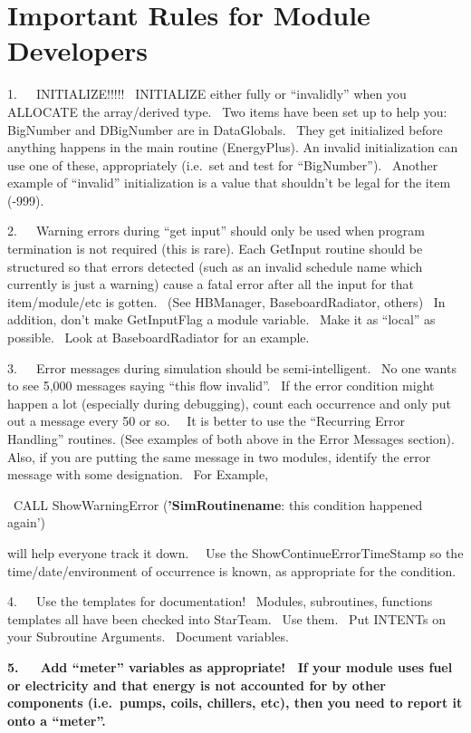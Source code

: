 \chapter{Important Rules for Module Developers}\label{important-rules-for-module-developers}

1.~~~INITIALIZE!!!!!~ INITIALIZE either fully or ``invalidly'' when you ALLOCATE the array/derived type.~ Two items have been set up to help you: BigNumber and DBigNumber are in DataGlobals.~ They get initialized before anything happens in the main routine (EnergyPlus). An invalid initialization can use one of these, appropriately (i.e.~set and test for ``BigNumber'').~ Another example of ``invalid'' initialization is a value that shouldn't be legal for the item (-999).

2.~~~Warning errors during ``get input'' should only be used when program termination is not required (this is rare). Each GetInput routine should be structured so that errors detected (such as an invalid schedule name which currently is just a warning) cause a fatal error after all the input for that item/module/etc is gotten.~ (See HBManager, BaseboardRadiator, others)~ In addition, don't make GetInputFlag a module variable.~ Make it as ``local'' as possible.~ Look at BaseboardRadiator for an example.

3.~~~Error messages during simulation should be semi-intelligent.~ No one wants to see 5,000 messages saying ``this flow invalid''.~ If the error condition might happen a lot (especially during debugging), count each occurrence and only put out a message every 50 or so.~~ It is better to use the ``Recurring Error Handling'' routines. (See examples of both above in the Error Messages section).~ Also, if you are putting the same message in two modules, identify the error message with some designation.~ For Example,

~CALL ShowWarningError (\textbf{'SimRoutinename}: this condition happened again')

will help everyone track it down.~~ Use the ShowContinueErrorTimeStamp so the time/date/environment of occurrence is known, as appropriate for the condition.

4.~~~Use the templates for documentation!~ Modules, subroutines, functions templates all have been checked into StarTeam.~ Use them.~ Put INTENTs on your Subroutine Arguments.~ Document variables.

\textbf{5.~~~Add ``meter'' variables as appropriate!~ If your module uses fuel or electricity and that energy is not accounted for by other components (i.e.~pumps, coils, chillers, etc), then you need to report it onto a ``meter''.}

